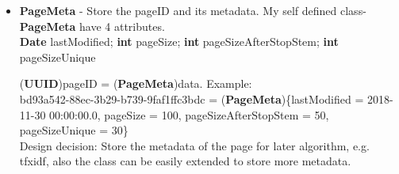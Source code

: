 \documentclass{article}
\begin{document}
\begin{itemize}
        \item \textbf{PageMeta} - Store the pageID and its metadata. My self defined class-\textbf{PageMeta} have 4 attributes. \\[0.4em]
        \textbf{Date} lastModified;
        \textbf{int} pageSize;
        \textbf{int} pageSizeAfterStopStem;
        \textbf{int} pageSizeUnique

        (\textbf{UUID})pageID = (\textbf{PageMeta})data. Example:\\[0.4em]
        bd93a542-88ec-3b29-b739-9faf1ffc3bdc = (\textbf{PageMeta})\{lastModified = 2018-11-30 00:00:00.0, pageSize = 100, pageSizeAfterStopStem = 50, pageSizeUnique = 30\}\\[0.4em]
        Design decision: Store the metadata of the page for later algorithm, e.g. tfxidf, also the class can be easily extended to store more metadata.
    \end{itemize}
\end{document}
